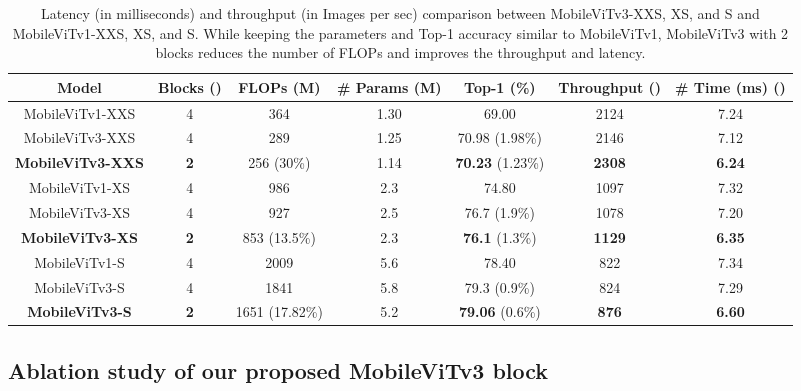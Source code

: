 \documentclass{article} \usepackage{iclr2022_conference,times}
\begin{document}
\begin{table}[!htb]
\centering
\scriptsize
\begin{tabular}{ccccccc} \toprule
    {Model} & {Blocks ()} & {FLOPs (M)} & {\# Params (M)}  & {Top-1 (\%)} &  {Throughput ()}  & {\# Time (ms) ()}  \\ 
    \midrule
    MobileViTv1-XXS & 4  & 364 & 1.30 & 69.00 & 2124 & 7.24  \\
    MobileViTv3-XXS & 4  & 289 & 1.25 & 70.98 (1.98\%) & 2146 & 7.12  \\
    \textbf{MobileViTv3-XXS} & \textbf{2}  & 256 (30\%) & 1.14 & \textbf{70.23} (1.23\%) & \textbf{2308} & \textbf{6.24}  \\
    \midrule
    MobileViTv1-XS & 4  & 986 & 2.3 & 74.80 & 1097 & 7.32  \\
    MobileViTv3-XS & 4  & 927 & 2.5 & 76.7 (1.9\%)  & 1078 & 7.20  \\
    \textbf{MobileViTv3-XS} & \textbf{2}  & 853 (13.5\%) & 2.3 & \textbf{76.1}  (1.3\%) & \textbf{1129} & \textbf{6.35}  \\
    \midrule
    MobileViTv1-S & 4  & 2009 & 5.6 & 78.40 & 822 & 7.34  \\
    MobileViTv3-S & 4  & 1841 & 5.8 & 79.3 (0.9\%)  & 824 & 7.29  \\
    \textbf{MobileViTv3-S} & \textbf{2}  & 1651 (17.82\%) & 5.2 & \textbf{79.06}  (0.6\%) & \textbf{876} & \textbf{6.60}  \\
    \bottomrule
\end{tabular}
\caption{Latency (in milliseconds) and throughput (in Images per sec) comparison between MobileViTv3-XXS, XS, and S and MobileViTv1-XXS, XS, and S. While keeping the parameters and Top-1 accuracy similar to MobileViTv1, MobileViTv3 with 2 blocks reduces the number of FLOPs and improves the throughput and latency.}
\label{table:latency}
\end{table}



\subsection{Ablation study of our proposed MobileViTv3 block}
\end{document}
